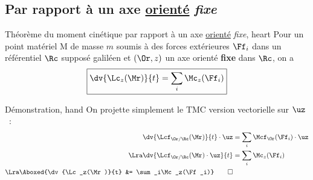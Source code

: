 \documentclass[../main/main.tex]{subfiles}
\begin{document}
\subsection{Par rapport à un axe \ul{orienté} \textit{fixe}}
\begin{tprop}{Théorème du moment cinétique par rapport à un axe \ul{orienté}
    \textit{fixe}, heart}
    Pour un point matériel M de masse $m$ soumis à des forces extérieures
    $\Ff_i$ dans un référentiel $\Rc$ supposé galiléen et $(\Or,z)$ un axe
    orienté \textbf{fixe} dans $\Rc$, on a
    \[\boxed{\dv{\Lc_z(\Mr)}{t} = \sum_i\Mc_z(\Ff_i)}\]
\end{tprop}
\begin{tdemo}{Démonstration, hand}
    On projette simplement le TMC version vectorielle sur $\uz$~:
    \begin{align*}
        \dv{\Lcf_{\Or/\Rc}(\Mr)}{t}\cdot\uz &= \sum_i\Mcf_{\Or}(\Ff_i)\cdot\uz
        \\\Lra
        \dv{\Lcf_{\Or/\Rc}(\Mr)\cdot\uz}{t} &= \sum_i\Mc_z(\Ff_i)
        \\\Lra
        \Aboxed{\dv{\Lc_z(\Mr)}{t} &= \sum_i\Mc_z(\Ff_i)}
        \qed
    \end{align*}
\end{tdemo}
\end{document}
